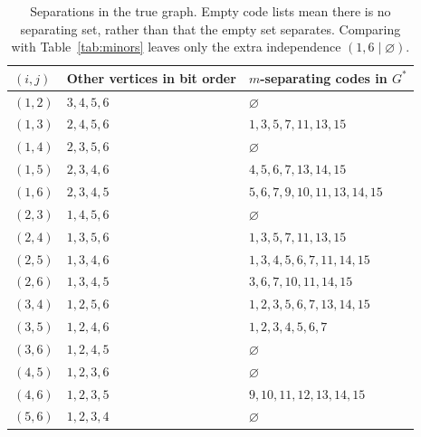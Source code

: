 \documentclass[11pt]{article}
\begin{document}
\begin{table}[!ht]
\centering\small
\begin{tabular}{@{}lll@{}}\toprule
$(i,j)$&Other vertices in bit order&$m$-separating codes in $G^*$\\\midrule
$(1,2)$&$3,4,5,6$&$\varnothing$\\
$(1,3)$&$2,4,5,6$&$1,3,5,7,11,13,15$\\
$(1,4)$&$2,3,5,6$&$\varnothing$\\
$(1,5)$&$2,3,4,6$&$4,5,6,7,13,14,15$\\
$(1,6)$&$2,3,4,5$&$5,6,7,9,10,11,13,14,15$\\
$(2,3)$&$1,4,5,6$&$\varnothing$\\
$(2,4)$&$1,3,5,6$&$1,3,5,7,11,13,15$\\
$(2,5)$&$1,3,4,6$&$1,3,4,5,6,7,11,14,15$\\
$(2,6)$&$1,3,4,5$&$3,6,7,10,11,14,15$\\
$(3,4)$&$1,2,5,6$&$1,2,3,5,6,7,13,14,15$\\
$(3,5)$&$1,2,4,6$&$1,2,3,4,5,6,7$\\
$(3,6)$&$1,2,4,5$&$\varnothing$\\
$(4,5)$&$1,2,3,6$&$\varnothing$\\
$(4,6)$&$1,2,3,5$&$9,10,11,12,13,14,15$\\
$(5,6)$&$1,2,3,4$&$\varnothing$\\
\bottomrule\end{tabular}
\caption{Separations in the true graph. Empty code lists mean there is
no separating set, rather than that the empty set separates. Comparing
with Table~\ref{tab:minors} leaves only the extra independence $(1,6\mid\varnothing)$.}
\label{tab:separations}\end{table}
\clearpage
\end{document}
